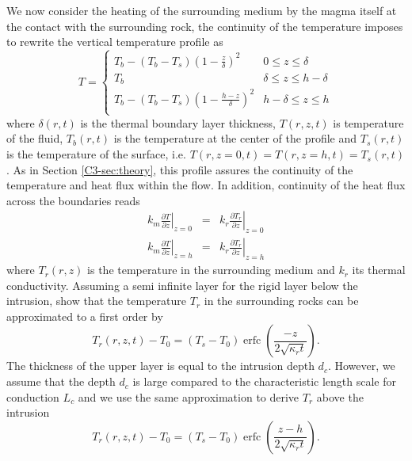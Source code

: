 We now  consider the heating  of the  surrounding medium by  the magma
itself at the contact with the surrounding rock, the continuity of the
temperature imposes to rewrite the vertical temperature profile as
\begin{equation}
  T=
  \begin{cases}
    T_b - (T_b-T_s)(1-\frac{z}{\delta})^2 & 0 \le z\le \delta \\
    T_b & \delta \le z\le h-\delta \\
    T_b - (T_b-T_s)(1-\frac{h-z}{\delta})^2 & h-\delta \le z\le h\\
  \end{cases}
  \label{C4-Temperature}
\end{equation}
where  $\delta(r,t)$   is  the   thermal  boundary   layer  thickness,
$T(r,z,t)$ is temperature of the  fluid, $T_b(r,t)$ is the temperature
at the center of the profile  and $T_s(r,t)$ is the temperature of the
surface,   i.e.   $T(r,z=0,t)=T(r,z=h,t)=T_s(r,t)$.  As   in   Section
\ref{C3-sec:theory},  this   profile  assures   the  continuity   of  the
temperature and heat flux within  the flow. In addition, continuity of
the heat flux across the boundaries reads
\begin{eqnarray}
  k_m\left.\frac{\partial                                    T}{\partial
  z}\right|_{z=0}&=&k_r\left.\frac{\partial              T_r}{\partial
                     z}\right|_{z=0}  \label{C4-Flux1}\\
  k_m\left.\frac{\partial                                  T}{\partial
  z}\right|_{z=h}&=&k_r\left.\frac{\partial            T_r}{\partial
                     z}\right|_{z=h}
                     \label{C4-Flux2}
\end{eqnarray}
where  $T_r(r,z)$ is  the temperature  in the  surrounding medium  and
$k_r$ its  thermal conductivity.  Assuming  a semi infinite  layer for
the rigid layer below  the intrusion, \citet{Carslaw:1959wf} show that
the temperature $T_r$ in the  surrounding rocks can be approximated to
a first order by
\begin{equation}
  T_r(r,z,t)-T_0=(T_{s}-T_0)\operatorname{erfc}{\left(\frac{-z}{2\sqrt{\kappa_r t}}\right)}.
  \label{C4-eq22}
\end{equation}
The  thickness of  the upper  layer is  equal to  the intrusion  depth
$d_c$. However,  we assume that the  depth $d_c$ is large  compared to
the characteristic  length scale for  conduction $L_c$ and we  use the
same approximation to derive $T_r$ above the intrusion
\begin{equation}
  T_r(r,z,t)-T_0=(T_{s}-T_0)\operatorname{erfc}{\left(\frac{z-h}{2\sqrt{\kappa_r t}}\right)}.
  \label{C4-eq11}
\end{equation}

